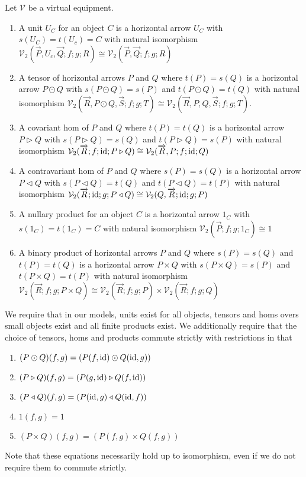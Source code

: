 \documentclass{llncs}
\begin{document}
\renewcommand{\vec}{\overrightarrow}
\begin{definition}
  Let $\mathcal V$ be a virtual equipment.
  \begin{enumerate}
  \item A unit $U_C$ for an object $C$ is a horizontal arrow $U_C$ with $s(U_C) = t(U_c) = C$ with natural isomorphism
    $\mathcal V_2(\vec P, U_c, \vec Q; f; g; R) \cong \mathcal V_2(\vec P, \vec Q; f; g; R)$
  \item A tensor of horizontal arrows $P$ and $Q$ where $t(P) = s(Q)$ is a horizontal arrow $P \odot Q$ with $s(P\odot Q) = s(P)$ and $t(P \odot Q) = t(Q)$ with natural isomorphism
    $\mathcal V_2(\vec R, P \odot Q,\vec S; f; g; T) \cong \mathcal V_2(\vec R, P, Q,\vec S; f; g; T)$.
  \item A covariant hom of $P$ and $Q$ where $t(P) = t(Q)$ is a horizontal arrow $P \triangleright Q$ with $s(P\triangleright Q) = s(Q)$ and $t(P \triangleright Q) = s(P)$ with natural isomorphism
    $\mathcal V_2(\vec R; f; \id; P \triangleright Q) \cong \mathcal V_2(\vec R, P; f; \id; Q)$
  \item A contravariant hom of $P$ and $Q$ where $s(P) = s(Q)$ is a horizontal arrow $P \triangleleft Q$ with $s(P\triangleleft Q) = t(Q)$ and $t(P \triangleleft Q) = t(P)$ with natural isomorphism
    $\mathcal V_2(\vec R; \id; g; P \triangleleft Q) \cong \mathcal V_2(Q, \vec R; \id; g; P)$
  \item A nullary product for an object $C$ is a horizontal arrow $1_C$ with $s(1_C) = t(1_C) = C$ with natural isomorphism
    $\mathcal V_2(\vec P; f; g; 1_C) \cong 1$
  \item A binary product of horizontal arrows $P$ and $Q$ where $s(P)= s(Q)$ and $t(P) = t(Q)$ is a horizontal arrow $P \times Q$ with $s(P \times Q) = s(P)$ and $t(P \times Q) = t(P)$ with natural isomorphism
    $\mathcal V_2(\vec R; f; g; P \times Q) \cong \mathcal V_2(\vec R; f; g; P) \times \mathcal V_2(\vec R; f; g; Q)$
  \end{enumerate}

  We require that in our models, units exist for all objects, tensors
  and homs overs small objects exist and all finite products exist. We
  additionally require that the choice of tensors, homs and products
  commute strictly with restrictions in that
  \begin{enumerate}
  \item $(P \odot Q)(f,g) = (P(f,\textrm{id}) \odot Q(\textrm{id}, g))$
  \item $(P \triangleright Q)(f,g) = (P(g, \textrm{id}) \triangleright Q(f,\textrm{id}))$
  \item $(P \triangleleft Q)(f,g) = (P(\textrm{id}, g) \triangleleft Q(\textrm{id}, f))$
  \item $1(f,g) = 1$
  \item $(P \times Q)(f,g) = (P(f, g) \times Q(f, g))$
  \end{enumerate}
  Note that these equations necessarily hold up to isomorphism, even
  if we do not require them to commute strictly.
\end{definition}
\end{document}

